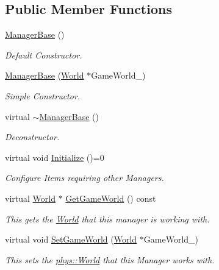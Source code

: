 \subsection*{Public Member Functions}
\begin{DoxyCompactItemize}
\item 
\hyperlink{classphys_1_1ManagerBase_a80c0d01d0dc19511cd08fc6ac805a616}{ManagerBase} ()
\begin{DoxyCompactList}\small\item\em Default Constructor. \item\end{DoxyCompactList}\item 
\hyperlink{classphys_1_1ManagerBase_ab9ad12416f771d95fe8a6d953923c634}{ManagerBase} (\hyperlink{classphys_1_1World}{World} $\ast$GameWorld\_\-)
\begin{DoxyCompactList}\small\item\em Simple Constructor. \item\end{DoxyCompactList}\item 
virtual \hyperlink{classphys_1_1ManagerBase_a802dace8381459637297e9a372bfdf0c}{$\sim$ManagerBase} ()
\begin{DoxyCompactList}\small\item\em Deconstructor. \item\end{DoxyCompactList}\item 
virtual void \hyperlink{classphys_1_1ManagerBase_a57dd8e54e767427d5bdcc86dc66d73ed}{Initialize} ()=0
\begin{DoxyCompactList}\small\item\em Configure Items requiring other Managers. \item\end{DoxyCompactList}\item 
virtual \hyperlink{classphys_1_1World}{World} $\ast$ \hyperlink{classphys_1_1ManagerBase_addfd62fbc444ca4c2aba40768d1b284e}{GetGameWorld} () const 
\begin{DoxyCompactList}\small\item\em This gets the \hyperlink{classphys_1_1World}{World} that this manager is working with. \item\end{DoxyCompactList}\item 
virtual void \hyperlink{classphys_1_1ManagerBase_a97eb1e77c1f7a0925fc623836368a262}{SetGameWorld} (\hyperlink{classphys_1_1World}{World} $\ast$GameWorld\_\-)
\begin{DoxyCompactList}\small\item\em This sets the \hyperlink{classphys_1_1World}{phys::World} that this Manager works with. \item\end{DoxyCompactList}\item 

\end{DoxyCompactItemize}
